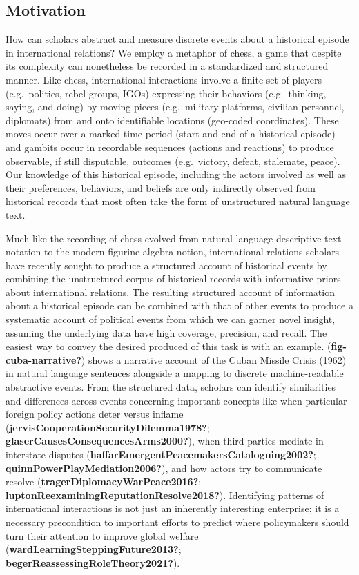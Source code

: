 \documentclass{article}
\begin{document}
\hypertarget{motivation}{%
\subsection{Motivation}\label{motivation}}

How can scholars abstract and measure discrete events about a historical
episode in international relations? We employ a metaphor of chess, a
game that despite its complexity can nonetheless be recorded in a
standardized and structured manner. Like chess, international
interactions involve a finite set of players (e.g.~polities, rebel
groups, IGOs) expressing their behaviors (e.g.~thinking, saying, and
doing) by moving pieces (e.g.~military platforms, civilian personnel,
diplomats) from and onto identifiable locations (geo-coded coordinates).
These moves occur over a marked time period (start and end of a
historical episode) and gambits occur in recordable sequences (actions
and reactions) to produce observable, if still disputable, outcomes
(e.g.~victory, defeat, stalemate, peace). Our knowledge of this
historical episode, including the actors involved as well as their
preferences, behaviors, and beliefs are only indirectly observed from
historical records that most often take the form of unstructured natural
language text.

Much like the recording of chess evolved from natural language
descriptive text notation to the modern figurine algebra notion,
international relations scholars have recently sought to produce a
structured account of historical events by combining the unstructured
corpus of historical records with informative priors about international
relations. The resulting structured account of information about a
historical episode can be combined with that of other events to produce
a systematic account of political events from which we can garner novel
insight, assuming the underlying data have high coverage, precision, and
recall. The easiest way to convey the desired produced of this task is
with an example. (\textbf{fig-cuba-narrative?}) shows a narrative
account of the Cuban Missile Crisis (1962) in natural language sentences
alongside a mapping to discrete machine-readable abstractive events.
From the structured data, scholars can identify similarities and
differences across events concerning important concepts like when
particular foreign policy actions deter versus inflame
(\textbf{jervisCooperationSecurityDilemma1978?};
\textbf{glaserCausesConsequencesArms2000?}), when third parties mediate
in interstate disputes
(\textbf{haffarEmergentPeacemakersCataloguing2002?};
\textbf{quinnPowerPlayMediation2006?}), and how actors try to
communicate resolve (\textbf{tragerDiplomacyWarPeace2016?};
\textbf{luptonReexaminingReputationResolve2018?}). Identifying patterns
of international interactions is not just an inherently interesting
enterprise; it is a necessary precondition to important efforts to
predict where policymakers should turn their attention to improve global
welfare (\textbf{wardLearningSteppingFuture2013?};
\textbf{begerReassessingRoleTheory2021?}).
\end{document}
